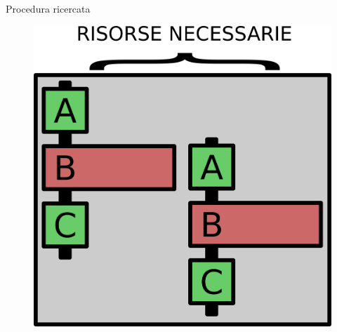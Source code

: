 \documentclass{beamer}
\begin{document}
\begin{frame}
\begin{columns}
\begin{column}{0.8\linewidth}
\begin{block}{Procedura ricercata}
\begin{figure}[H]
\centering
\includegraphics[scale=0.3]{concurrency1.png}
\end{figure}
\end{block}
\end{column}
\end{columns}
\end{frame}
\end{document}
